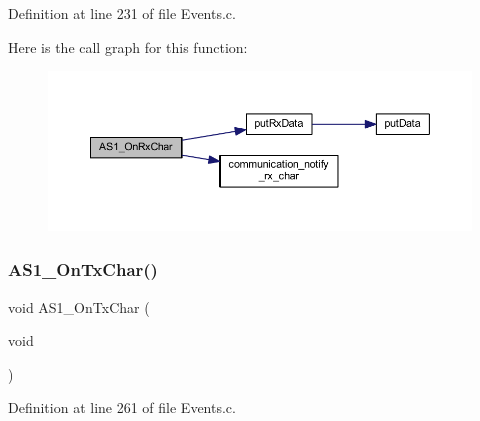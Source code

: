Definition at line 231 of file Events.\+c.

Here is the call graph for this function\+:
\nopagebreak
\begin{figure}[H]
\begin{center}
\leavevmode
\includegraphics[width=350pt]{group___events__module_gac72aa34766c66a614f29b1267cadfccc_cgraph}
\end{center}
\end{figure}
\mbox{\label{group___events__module_gad4ca2c06cb7fdb57a52811247371565c}} 
\subsubsection{\texorpdfstring{A\+S1\+\_\+\+On\+Tx\+Char()}{AS1\_OnTxChar()}}
{\footnotesize\ttfamily void A\+S1\+\_\+\+On\+Tx\+Char (\begin{DoxyParamCaption}\item[{void}]{ }\end{DoxyParamCaption})}



Definition at line 261 of file Events.\+c.

